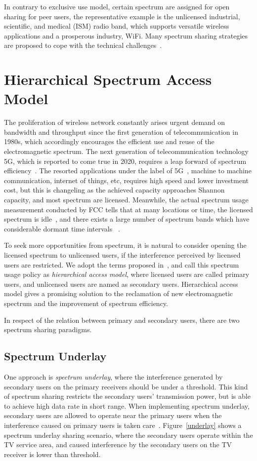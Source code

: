 %
In contrary to exclusive use model, certain spectrum are assigned for open sharing for peer users, the representative example is the unlicensed industrial, scientific, and medical (ISM) radio band, which supports versatile wireless applications and a prosperous industry, \ie WiFi.
Many spectrum sharing strategies are proposed to cope with the technical challenges~\cite{Ko_DistributedCA}.

\section{Hierarchical Spectrum Access Model}
\label{hierarchical}
The proliferation of wireless network constantly arises urgent demand on bandwidth and throughput since the first generation of telecommunication in 1980s, which accordingly encourages the efficient use and reuse of the electromagnetic spectrum.
The next generation of telecommunication technology 5G, which is reported to come true in 2020, requires a leap forward of spectrum efficiency~\cite{5G_2014}.
The resorted applications under the label of 5G~\cite{5directions5G_2014}, \ie machine to machine communication, internet of things, etc, requires high speed and lower investment cost, but this is changeling as the achieved capacity approaches Shannon capacity, and most spectrum are licensed.
Meanwhile, the actual spectrum usage measurement conducted by FCC tells that at many locations or time, the licensed spectrum is idle~\cite{FCC_spectrumEfficiency_2002}, and there exists a large number of spectrum bands which have considerable dormant time intervals ~\cite{Akyildiz06survey}.


To seek more opportunities from spectrum, it is natural to consider opening the licensed spectrum to unlicensed users, if the interference perceived by licensed users are restricted.
We adopt the terms proposed in~\cite{zhao_survey_DSA_2007}, and call this spectrum usage policy as \textit{hierarchical access model}, where licensed users are called primary users, and unlicensed users are named as secondary users.
Hierarchical access model gives a promising solution to the reclamation of new electromagnetic spectrum and the improvement of spectrum efficiency.

In respect of the relation between primary and secondary users, there are two spectrum sharing paradigms.
\subsection{Spectrum Underlay}
One approach is \textit{spectrum underlay}, where the interference generated by secondary users on the primary receivers should be under a threshold. 
This kind of spectrum sharing restricts the secondary users' transmission power, but is able to achieve high data rate in short range.
When implementing spectrum underlay, secondary users are allowed to operate near the primary users when the interference caused on primary users is taken care~\cite{Ellingsaeter2012_Increasing_Available}.
Figure~\ref{underlay} shows a spectrum underlay sharing scenario, where the secondary users operate within the TV service area, and caused interference by the secondary users on the TV receiver is lower than threshold.

